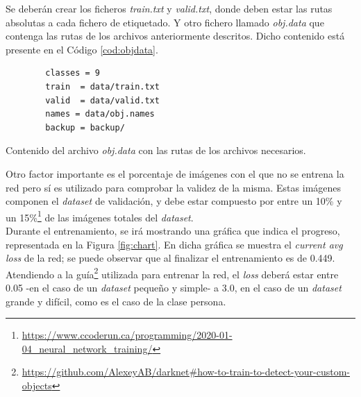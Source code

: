Se deberán crear los ficheros \textit{train.txt} y \textit{valid.txt}, donde deben estar las rutas absolutas a cada fichero de etiquetado. Y otro fichero llamado \textit{obj.data} que contenga las rutas de los archivos anteriormente descritos. Dicho contenido está presente en el Código \ref{cod:objdata}.\\

\begin{code}[h]
	\begin{lstlisting}
		classes = 9
		train  = data/train.txt
		valid  = data/valid.txt
		names = data/obj.names
		backup = backup/
	\end{lstlisting}
	\caption[Contenido del archivo \textit{obj.data} con las rutas de los archivos necesarios.]{Contenido del archivo \textit{obj.data} con las rutas de los archivos necesarios.}
	\label{cod:objdata}
\end{code}

Otro factor importante es el porcentaje de imágenes con el que no se entrena la red pero sí es utilizado para comprobar la validez de la misma. Estas imágenes componen el \textit{dataset} de validación, y debe estar compuesto por entre un 10\% y un 15\%\footnote{\url{https://www.ccoderun.ca/programming/2020-01-04_neural_network_training/}} de las imágenes totales del \textit{dataset}.\\

Durante el entrenamiento, se irá mostrando una gráfica que indica el progreso, representada en la Figura \ref{fig:chart}. En dicha gráfica se muestra el \textit{current avg loss} de la red; se puede observar que al finalizar el entrenamiento es de 0.449. Atendiendo a la guía\footnote{\url{https://github.com/AlexeyAB/darknet\#how-to-train-to-detect-your-custom-objects}} utilizada para entrenar la red, el \textit{loss} deberá estar entre 0.05 -en el caso de un \textit{dataset} pequeño y simple- a 3.0, en el caso de un \textit{dataset} grande y difícil, como es el caso de la clase persona.\\

